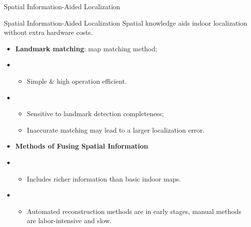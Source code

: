 \begin{frame}{Spatial Information-Aided Localization}

	\begin{block}{Spatial Information-Aided Localization}
		Spatial knowledge aids indoor localization without extra hardware costs.
	\end{block}
	\pause
	\begin{itemize}
		\item \textbf{Landmark matching}: map matching method;
		\item {}
		      \begin{itemize}
			    	\item Simple \& high operation efficient.
		      \end{itemize}
		\item {}
		      \begin{itemize}
			      \item Sensitive to landmark detection completeness;
			      \item Inaccurate matching may lead to a larger localization error.
		      \end{itemize}
		\item \textbf{Methods of Fusing Spatial Information}
		\item {}
		      \begin{itemize}
			      \item Includes richer information than basic indoor maps.
		      \end{itemize}
		\item {}
		      \begin{itemize}
			      \item Automated reconstruction methods are in early stages, manual methods are labor-intensive and slow.
		      \end{itemize}
	\end{itemize}
\end{frame}